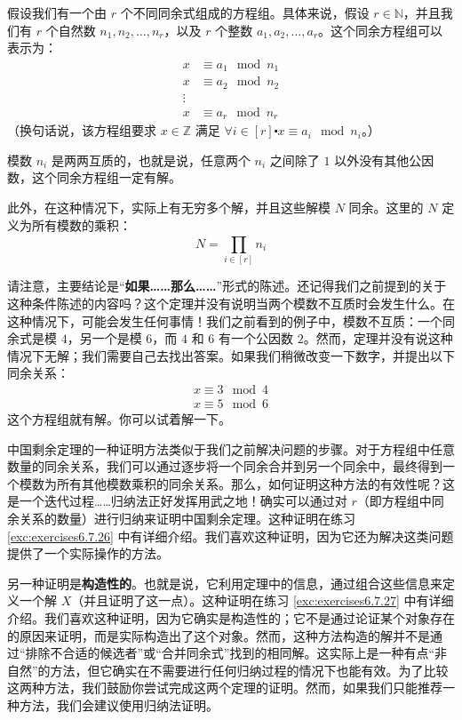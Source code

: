 \begin{theorem}\label{theorem6.5.28}
    假设我们有一个由 $r$ 个不同同余式组成的方程组。具体来说，假设 $r \in \mathbb{N}$，并且我们有 $r$ 个自然数 $n_1, n_2, \dots, n_r$，以及 $r$ 个整数 $a_1, a_2, \dots, a_r$。这个同余方程组可以表示为：
    \begin{align*}
        x &\equiv a_1 \mod n_1 \\
        x &\equiv a_2 \mod n_2 \\
        \vdots \\
        x &\equiv a_r \mod n_r
    \end{align*}
    （换句话说，该方程组要求 $x \in \mathbb{Z}$ 满足 $\forall i \in [r] \centerdot x \equiv a_i \mod n_i$。）

    模数 $n_i$ 是两两互质的，也就是说，任意两个 $n_i$ 之间除了 $1$ 以外没有其他公因数，这个同余方程组一定有解。

    此外，在这种情况下，实际上有无穷多个解，并且这些解模 $N$ 同余。这里的 $N$ 定义为所有模数的乘积：
    \[N = \prod_{i \in [r]}^{} n_i\]
\end{theorem}

请注意，主要结论是``\textbf{如果……那么……}''形式的陈述。还记得我们之前提到的关于这种条件陈述的内容吗？这个定理并没有说明当两个模数不互质时会发生什么。在这种情况下，可能会发生任何事情！我们之前看到的例子中，模数不互质：一个同余式是模 $4$，另一个是模 $6$，而 $4$ 和 $6$ 有一个公因数 $2$。然而，定理并没有说这种情况下无解；我们需要自己去找出答案。如果我们稍微改变一下数字，并提出以下同余关系：
\begin{align*}
    x \equiv 3 \mod 4 \\
    x \equiv 5 \mod 6
\end{align*}
这个方程组就有解。你可以试着解一下。

中国剩余定理的一种证明方法类似于我们之前解决问题的步骤。对于方程组中任意数量的同余关系，我们可以通过逐步将一个同余合并到另一个同余中，最终得到一个模数为所有其他模数乘积的同余关系。那么，如何证明这种方法的有效性呢？这是一个迭代过程……归纳法正好发挥用武之地！确实可以通过对 $r$（即方程组中同余关系的数量）进行归纳来证明中国剩余定理。这种证明在练习 \ref{exc:exercises6.7.26} 中有详细介绍。我们喜欢这种证明，因为它还为解决这类问题提供了一个实际操作的方法。

另一种证明是\textbf{构造性的}。也就是说，它利用定理中的信息，通过组合这些信息来定义一个解 $X$（并且证明了这一点）。这种证明在练习 \ref{exc:exercises6.7.27} 中有详细介绍。我们喜欢这种证明，因为它确实是构造性的；它不是通过论证某个对象存在的原因来证明，而是实际构造出了这个对象。然而，这种方法构造的解并不是通过``排除不合适的候选者''或``合并同余式''找到的相同解。这实际上是一种有点``非自然''的方法，但它确实在不需要进行任何归纳过程的情况下也能有效。为了比较这两种方法，我们鼓励你尝试完成这两个定理的证明。然而，如果我们只能推荐一种方法，我们会建议使用归纳法证明。

